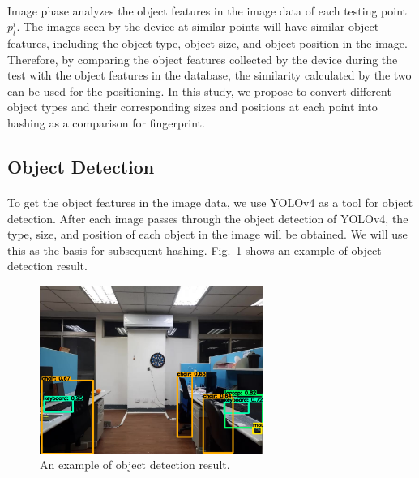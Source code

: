 \documentclass[a4paper,12pt]{report}
\begin{document}
\paragraph{}
Image phase analyzes the object features in the image data of each testing point $p_t^i$. The images seen by the device at similar points will have similar object features, including the object type, object size, and object position in the image. Therefore, by comparing the object features collected by the device during the test with the object features in the database, the similarity calculated by the two can be used for the positioning. In this study, we propose to convert different object types and their corresponding sizes and positions at each point into hashing as a comparison for fingerprint.
%

\subsection{Object Detection}

\paragraph{}
To get the object features in the image data, we use YOLOv4 \cite{Bochkovskiy2020YOLOv4} as a tool for object detection. After each image passes through the object detection of YOLOv4, the type, size, and position of each object in the image will be obtained. We will use this as the basis for subsequent hashing. Fig.~\ref{figure:3_4_YOLOv4_Object_Detection} shows an example of object detection result.

\begin{figure}[tbph]
    \begin{center}
    \includegraphics[width=0.65\textwidth]{images/3_4_YOLOv4_Object_Detection.png}
    \caption{ An example of object detection result.}
    \label{figure:3_4_YOLOv4_Object_Detection}
    \end{center}
\end{figure}
\end{document}
